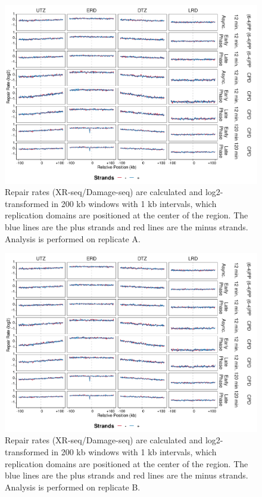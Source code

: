 \begin{figure}[H]
\begin{center}
\includegraphics[width=\textwidth]{Chapters/7_appendix/figures/supfig20}
\caption[Repair rates of replication domains in 200 kb (replicate A).]{Repair rates (XR-seq/Damage-seq) are calculated and log2-transformed in 200 kb windows with 1 kb intervals, which replication domains are positioned at the center of the region. The blue lines are the plus strands and red lines are the minus strands. Analysis is performed on replicate A.}
\label{supfig:repairrate200repdomainA}
\end{center}
\end{figure}

\begin{figure}[H]
\begin{center}
\includegraphics[width=\textwidth]{Chapters/7_appendix/figures/supfig21}
\caption[Repair rates of replication domains in 200 kb (replicate B).]{Repair rates (XR-seq/Damage-seq) are calculated and log2-transformed in 200 kb windows with 1 kb intervals, which replication domains are positioned at the center of the region. The blue lines are the plus strands and red lines are the minus strands. Analysis is performed on replicate B.}
\label{supfig:repairrate200repdomainB}
\end{center}
\end{figure}

